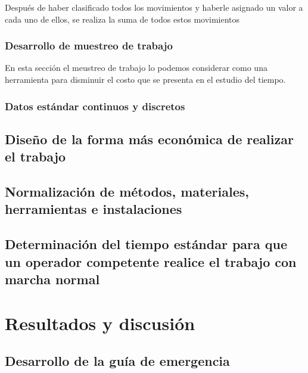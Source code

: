     Después de haber clasificado todos los movimientos y haberle asignado un valor a cada uno de ellos, se realiza la suma de todos estos movimientos
        
    \subsubsection{Desarrollo de muestreo de trabajo}
    En esta sección el meustreo de trabajo lo podemos considerar como una herramienta para disminuir el costo que se presenta en el estudio del tiempo. 
    
    \subsubsection{Datos estándar continuos y discretos}
    \subsection{Diseño de la forma más económica de realizar el trabajo}
    \subsection{Normalización de métodos, materiales, herramientas e instalaciones}
    \subsection{Determinación del tiempo estándar para que un operador competente realice el trabajo con marcha normal}
    
    
    
    
    

    


    
    \section{Resultados y discusión}
    \subsection{Desarrollo de la guía de emergencia}
    
